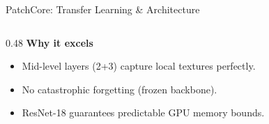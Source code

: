 \begin{frame}{PatchCore: Transfer Learning \& Architecture}
\begin{columns}[T]
\begin{column}{0.48\textwidth}
    \vspace{6pt}
    \textbf{\color{teal}Why it excels}
    \begin{itemize}\scriptsize\setlength{\itemsep}{1pt}
      \item Mid-level layers (2+3) capture local textures perfectly.
      \item No catastrophic forgetting (frozen backbone).
      \item ResNet-18 guarantees predictable GPU memory bounds.
    \end{itemize}
  \end{column}
\end{columns}
\end{frame}
